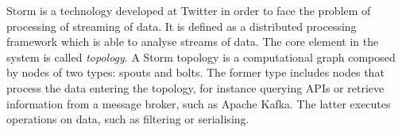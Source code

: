 Storm is a technology developed at Twitter \cite{toshniwal2014storm} in order to
face the problem of processing of streaming of data. It is defined as a
distributed processing framework which is able to analyse streams of data. The
core element in the system is called \emph{topology}. A Storm topology is a
computational graph composed by nodes of two types: spouts and bolts. The former
type includes nodes that process the data entering the topology, for instance
querying APIs or retrieve information from a message broker, such as Apache
Kafka. The latter executes operations on data, such as filtering or serialising.
